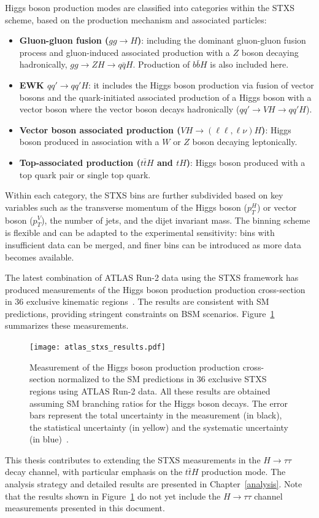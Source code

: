 Higgs boson production modes are classified into categories within the STXS scheme, based on the production mechanism and associated particles:

\begin{itemize}
    \item \textbf{Gluon-gluon fusion ($gg \to H$)}: including the dominant gluon-gluon fusion process and gluon-induced associated production with a $Z$ boson decaying hadronically, $gg \to ZH \to q\bar{q}H$. Production of $b\bar{b}H$ is also included here.
    \item \textbf{EWK $qq'\to qq'H$}: it includes the Higgs boson production via fusion of vector bosons and the quark-initiated associated production of a Higgs boson with a vector boson where the vector boson decays hadronically ($qq'\to VH \to qq'H$).
    \item \textbf{Vector boson associated production ($VH \to (\ell \ell, \ell\nu)H$)}: Higgs boson produced in association with a $W$ or $Z$ boson decaying leptonically.
    \item \textbf{Top-associated production ($t\bar{t}H$ and $tH$)}: Higgs boson produced with a top quark pair or single top quark.
\end{itemize}

Within each category, the STXS bins are further subdivided based on key variables such as the transverse momentum of the Higgs boson ($p^H_T$) or vector boson ($p^V_T$), the number of jets, and the dijet invariant mass. The binning scheme is flexible and can be adapted to the experimental sensitivity: bins with insufficient data can be merged, and finer bins can be introduced as more data becomes available.

The latest combination of ATLAS Run-2 data using the STXS framework has produced measurements of the Higgs boson production production cross-section in 36 exclusive kinematic regions~\cite{Nature_ATLAS}. The results are consistent with SM predictions, providing stringent constraints on BSM scenarios. Figure~\ref{fig:atlas-stxs-results} summarizes these measurements.

\begin{figure}[htbp]
    \centering
    \texttt{[image: atlas\_stxs\_results.pdf]}
    \caption{Measurement of the Higgs boson production production cross-section normalized to the SM predictions in 36 exclusive STXS regions using ATLAS Run-2 data. All these results are obtained assuming SM branching ratios for the Higgs boson decays. The error bars represent the total uncertainty in the measurement (in black), the statistical uncertainty (in yellow) and the systematic uncertainty (in blue)~\cite{Nature_ATLAS}.}
    \label{fig:atlas-stxs-results}
\end{figure}

This thesis contributes to extending the STXS measurements in the $H \to \tau \tau$ decay channel, with particular emphasis on the $t\bar{t}H$ production mode. The analysis strategy and detailed results are presented in Chapter~\ref{analysis}. Note that the results shown in Figure~\ref{fig:atlas-stxs-results} do not yet include the $H \to \tau \tau$ channel measurements presented in this document.

